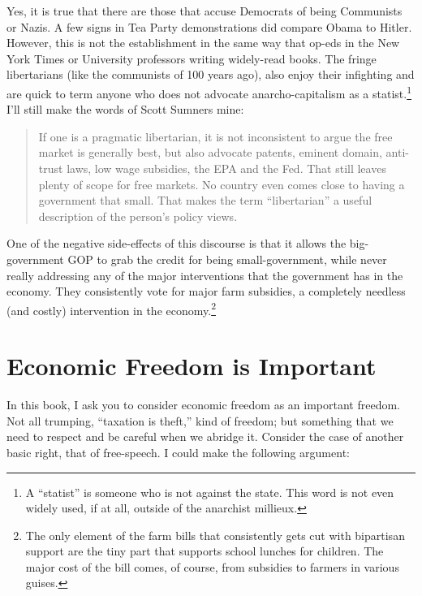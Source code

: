 Yes, it is true that there are those that accuse Democrats of being Communists
or Nazis. A few signs in Tea Party demonstrations did compare Obama to Hitler.
However, this is not the establishment in the same way that op-eds in the New
York Times or University professors writing widely-read books. The fringe
libertarians (like the communists of 100 years ago), also enjoy their
infighting and are quick to term anyone who does not advocate
anarcho-capitalism as a statist.\footnote{A ``statist'' is someone who is not
against the state. This word is not even widely used, if at all, outside of the
anarchist millieux.} I'll still make the words of Scott Sumners
mine:

\begin{quote}
If one is a pragmatic libertarian, it is not inconsistent to argue the free
market is generally best, but also advocate patents, eminent domain, anti-trust
laws, low wage subsidies, the EPA and the Fed.  That still leaves plenty of
scope for free markets.  No country even comes close to having a government
that small.  That makes the term ``libertarian'' a useful description of the
person's policy views.
\end{quote}

One of the negative side-effects of this discourse is that it allows the
big-government GOP to grab the credit for being small-government, while never
really addressing any of the major interventions that the government has in the
economy. They consistently vote for major farm subsidies, a completely needless
(and costly) intervention in the economy.\footnote{The only element of the farm
bills that consistently gets cut with bipartisan support are the tiny part that
supports school lunches for children. The major cost of the bill comes, of
course, from subsidies to farmers in various guises.}


\section{Economic Freedom is Important}

In this book, I ask you to consider economic freedom as an important freedom.
Not all trumping, ``taxation is theft,'' kind of freedom; but something that we
need to respect and be careful when we abridge it. Consider the case of another
basic right, that of free-speech. I could make the following argument:

